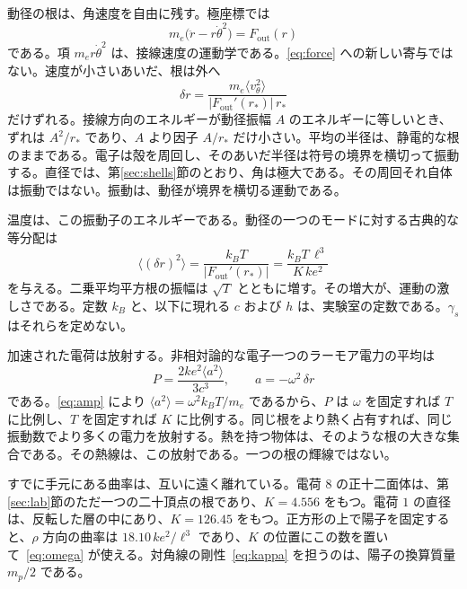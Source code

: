 \documentclass[a4paper]{article}
\begin{document}
動径の根は、角速度を自由に残す。極座標では
\begin{equation}
\label{eq:polar}
m_e\bigl(\ddot r-r\dot\theta^{2}\bigr)=F_{\mathrm{out}}(r)
\end{equation}
である。項 \(m_e r\dot\theta^{2}\) は、接線速度の運動学である。\eqref{eq:force} への新しい寄与ではない。速度が小さいあいだ、根は外へ
\begin{equation}
\label{eq:shift}
\delta r=\frac{m_e\langle v_{\theta}^{2}\rangle}{|F_{\mathrm{out}}'(r_*)|\,r_*}
\end{equation}
だけずれる。接線方向のエネルギーが動径振幅 \(A\) のエネルギーに等しいとき、ずれは \(A^{2}/r_*\) であり、\(A\) より因子 \(A/r_*\) だけ小さい。平均の半径は、静電的な根のままである。電子は殻を周回し、そのあいだ半径は符号の境界を横切って振動する。直径では、第\ref{sec:shells}節のとおり、角は極大である。その周回それ自体は振動ではない。振動は、動径が境界を横切る運動である。

温度は、この振動子のエネルギーである。動径の一つのモードに対する古典的な等分配は
\begin{equation}
\label{eq:amp}
\langle(\delta r)^{2}\rangle
  =\frac{k_B T}{|F_{\mathrm{out}}'(r_*)|}
  =\frac{k_B T\,\ell^{3}}{K\,k e^{2}}
\end{equation}
を与える。二乗平均平方根の振幅は \(\sqrt{T}\) とともに増す。その増大が、運動の激しさである。定数 \(k_B\) と、以下に現れる \(c\) および \(h\) は、実験室の定数である。\(\gamma_s\) はそれらを定めない。

加速された電荷は放射する。非相対論的な電子一つのラーモア電力の平均は
\begin{equation}
\label{eq:larmor}
P=\frac{2k e^{2}\langle a^{2}\rangle}{3c^{3}},
\qquad
a=-\omega^{2}\,\delta r
\end{equation}
である。\eqref{eq:amp} により \(\langle a^{2}\rangle=\omega^{2} k_B T/m_e\) であるから、\(P\) は \(\omega\) を固定すれば \(T\) に比例し、\(T\) を固定すれば \(K\) に比例する。同じ根をより熱く占有すれば、同じ振動数でより多くの電力を放射する。熱を持つ物体は、そのような根の大きな集合である。その熱線は、この放射である。一つの根の輝線ではない。

すでに手元にある曲率は、互いに遠く離れている。電荷 \(8\) の正十二面体は、第\ref{sec:lab}節のただ一つの二十頂点の根であり、\(K=4.556\) をもつ。電荷 \(1\) の直径は、反転した層の中にあり、\(K=126.45\) をもつ。正方形の上で陽子を固定すると、\(\rho\) 方向の曲率は \(18.10\,k e^{2}/\ell^{3}\) であり、\(K\) の位置にこの数を置いて~\eqref{eq:omega} が使える。対角線の剛性~\eqref{eq:kappa} を担うのは、陽子の換算質量 \(m_p/2\) である。
\end{document}
